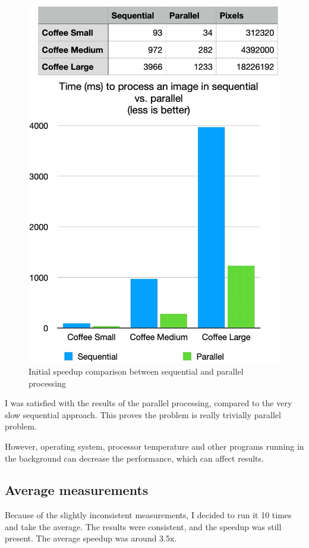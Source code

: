 \documentclass{article}
\begin{document}
\begin{multicols}{2}
    \begin{figure}[H]
        \centering
        \includegraphics[width=\linewidth]{img/parallel_speedup.jpg}
        \caption{Initial speedup comparison between sequential and parallel processing}
        \label{fig:speedup}
    \end{figure}

    I was satisfied with the results of the parallel processing, compared to the very slow sequential approach. This proves the problem is really trivially parallel problem.

    However, operating system, processor temperature and other programs running in the background can decrease the performance, which can affect results.

    \pagebreak

    \subsection{Average measurements}
    Because of the slightly inconsistent measurements, I decided to run it 10 times and take the average. The results were consistent, and the speedup was still present. The average speedup was around 3.5x.


\end{multicols}
\end{document}
